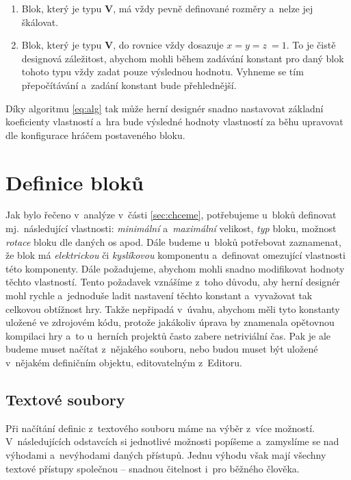 \begin{enumerate}
	\item Blok, který je typu \textbf{V}, má vždy pevně definované rozměry a~nelze jej škálovat.
	\item Blok, který je typu \textbf{V}, do rovnice vždy dosazuje $ x = y = z~= 1$.
	\subitem To je čistě designová záležitost, abychom mohli během zadávání konstant pro daný blok tohoto typu vždy zadat pouze výslednou hodnotu. Vyhneme se tím přepočítávání a~zadání konstant bude přehlednější.
\end{enumerate}

Díky algoritmu \ref{eq:alg} tak může herní designér snadno nastavovat základní koeficienty vlastností a~hra bude výsledné hodnoty vlastností za běhu upravovat dle konfigurace hráčem postaveného bloku.




\section{Definice bloků}
\label{sec:db}

Jak bylo řečeno v~analýze v~části \ref{sec:chceme}, potřebujeme u~bloků definovat mj.~následující vlastnosti: \textit{minimální} a~\textit{maximální} velikost, \textit{typ} bloku, možnost \textit{rotace} bloku dle daných os apod. Dále budeme u~bloků potřebovat zaznamenat, že blok má \textit{elektrickou} či \textit{kyslíkovou} komponentu a~definovat omezující vlastnosti této komponenty. Dále požadujeme, abychom mohli snadno modifikovat hodnoty těchto vlastností. Tento požadavek vznášíme z~toho důvodu, aby herní designér mohl rychle a~jednoduše ladit nastavení těchto konstant a~vyvažovat tak celkovou obtížnost hry. Takže nepřipadá v~úvahu, abychom měli tyto konstanty uložené ve zdrojovém kódu, protože jakákoliv úprava by znamenala opětovnou kompilaci hry a~to u~herních projektů často zabere netriviální čas. Pak je ale budeme muset načítat z~nějakého souboru, nebo budou muset být uložené v~nějakém definičním objektu, editovatelným z~Editoru.


\subsection{Textové soubory}
Při načítání definic z~textového souboru máme na výběr z~více možností. V~následujících odstavcích si jednotlivé možnosti popíšeme a~zamyslíme se nad výhodami a~nevýhodami daných přístupů. Jednu výhodu však mají všechny textové přístupy společnou -- snadnou čitelnost i~pro běžného člověka.

